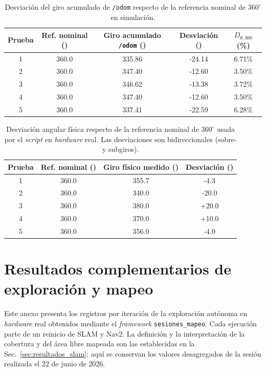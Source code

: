 \begin{appendices}
\begin{table}[H]
\centering
\caption{Desviación del giro acumulado de \texttt{/odom} respecto de la referencia nominal de $360^\circ$ en simulación.}
\label{tab:odom_giro_sim}
\small
\begin{tabular}{ccccc}
\toprule
\textbf{Prueba} & \textbf{Ref. nominal (\textdegree{})} & \textbf{Giro acumulado \texttt{/odom} (\textdegree{})} & \textbf{Desviación (\textdegree{})} & \textbf{$D_{\theta,360}$ (\%)} \\
\midrule
1 & 360.0 & 335.86 & -24.14 & 6.71\% \\
2 & 360.0 & 347.40 & -12.60 & 3.50\% \\
3 & 360.0 & 346.62 & -13.38 & 3.72\% \\
4 & 360.0 & 347.40 & -12.60 & 3.50\% \\
5 & 360.0 & 337.41 & -22.59 & 6.28\% \\
\bottomrule
\end{tabular}
\end{table}

\begin{table}[H]
\centering
\caption{Desviación angular física respecto de la referencia nominal de $360^\circ$ usada por el \textit{script} en \textit{hardware} real. Las desviaciones son bidireccionales (sobre- y subgiros).}
\label{tab:odom_giro}
\small
\begin{tabular}{cccc}
\toprule
\textbf{Prueba} & \textbf{Ref. nominal (\textdegree{})} & \textbf{Giro físico medido (\textdegree{})} & \textbf{Desviación (\textdegree{})} \\
\midrule
1 & 360.0 & 355.7 & -4.3 \\
2 & 360.0 & 340.0 & -20.0 \\
3 & 360.0 & 380.0 & +20.0 \\
4 & 360.0 & 370.0 & +10.0 \\
5 & 360.0 & 356.0 & -4.0 \\

\bottomrule
\end{tabular}
\end{table}

\section{Resultados complementarios de exploración y mapeo}
\label{anx:protocolo_resultados}

Este anexo presenta los registros por iteración de la exploración autónoma en \textit{hardware} real obtenidos mediante el \textit{framework} \texttt{sesiones\_mapeo}. Cada ejecución parte de un reinicio de SLAM y Nav2. La definición y la interpretación de la cobertura y del área libre mapeada son las establecidas en la Sec.~\ref{sec:resultados_slam}; aquí se conservan los valores desagregados de la sesión realizada el 22 de junio de 2026.


\end{appendices}
